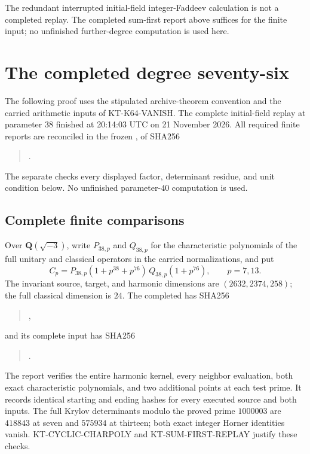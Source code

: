 \documentclass[11pt,a4paper]{article}
\theoremstyle{definition}
\begin{document}
The redundant interrupted initial-field integer-Faddeev
calculation is not a completed replay.  The completed
sum-first report above suffices for the finite input;
no unfinished further-degree computation is used here.



\section{The completed degree seventy-six}
\label{sec:kt-further-e38}

The following proof uses the stipulated archive-theorem convention
and the carried arithmetic inputs of KT-K64-VANISH.  The complete
initial-field replay at parameter $38$ finished at 20:14:03 UTC on
21 November 2026.  All required finite reports are reconciled in
the frozen ,
of SHA256
\begin{quote}\small
{}.
\end{quote}
The separate  checks every
displayed factor, determinant residue, and unit condition below.
No unfinished parameter-$40$ computation is used.

\subsection{Complete finite comparisons}

Over $\mathbf Q(\sqrt{-3})$, write $P_{38,p}$ and $Q_{38,p}$ for
the characteristic polynomials of the full unitary and classical
operators in the carried normalizations, and put
\[
 C_p=P_{38,p}(1+p^{38}+p^{76})\,Q_{38,p}(1+p^{76}),
                  \qquad p=7,13.                         \tag{KF38.1}
\]
The invariant source, target, and harmonic dimensions are
$(2632,2374,258)$; the full classical dimension is $24$.
The completed 
has SHA256
\begin{quote}\small
{},
\end{quote}
and its complete input has SHA256
\begin{quote}\small
{}.
\end{quote}
The report verifies the entire harmonic kernel, every neighbor
evaluation, both exact characteristic polynomials, and two
additional points at each test prime.  It records identical
starting and ending hashes for every executed source and both
inputs.  The full Krylov determinants modulo the proved prime
$1000003$ are $418843$ at seven and $575934$ at thirteen;
both exact integer Horner identities vanish.
KT-CYCLIC-CHARPOLY and KT-SUM-FIRST-REPLAY justify these checks.
\end{document}
